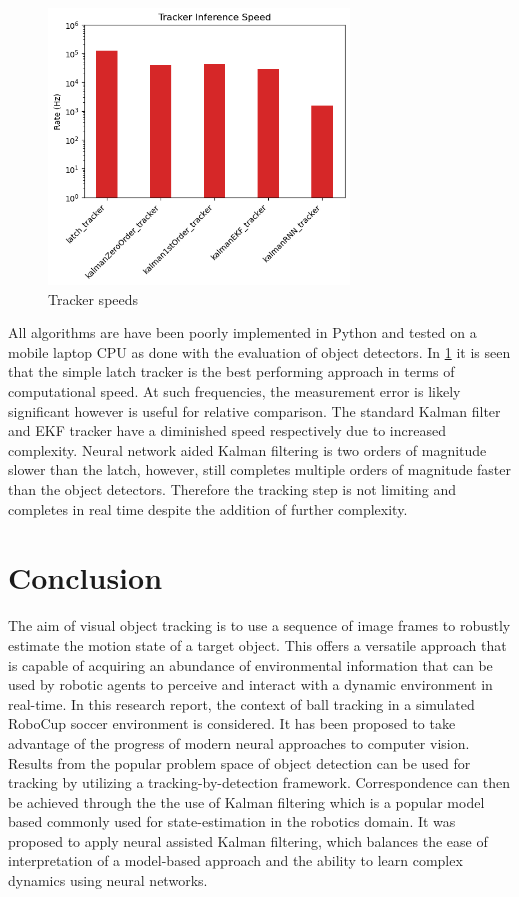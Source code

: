 \documentclass[a4paper,twoside,12pt]{report}
\begin{document}
\begin{figure}[h!]
\begin{center}
\includegraphics[width=8cm]{images/tracker_speeds.png}
\caption{Tracker speeds}
\label{fig:trackspeeds}
\end{center}
\end{figure}

All algorithms are have been poorly implemented in Python and tested on a mobile laptop CPU as done with the evaluation of object detectors. In \ref{fig:trackspeeds} it is seen that the simple latch tracker is the best performing approach in terms of computational speed. At such frequencies, the measurement error is likely significant however is useful for relative comparison. The standard Kalman filter and EKF tracker have a diminished speed respectively due to increased complexity. Neural network aided Kalman filtering is two orders of magnitude slower than the latch, however, still completes multiple orders of magnitude faster than the object detectors. Therefore the tracking step is not limiting and completes in real time despite the addition of further complexity. 

\chapter{Conclusion}

The aim of visual object tracking is to use a sequence of image frames to robustly estimate the motion state of a target object. This offers a versatile approach that is capable of acquiring an abundance of environmental information that can be used by robotic agents to perceive and interact with a dynamic environment in real-time. In this research report, the context of ball tracking in a simulated RoboCup soccer environment is considered. It has been proposed to take advantage of the progress of modern neural approaches to computer vision. Results from the popular problem space of object detection can be used for tracking by utilizing a tracking-by-detection framework. Correspondence can then be achieved through the the use of Kalman filtering which is a popular model based commonly used for state-estimation in the robotics domain. It was proposed to apply neural assisted Kalman filtering, which balances the ease of interpretation of a model-based approach and the ability to learn complex dynamics using neural networks. 
\end{document}
